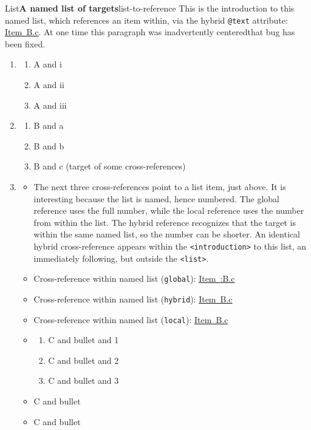 \documentclass[pdflatex]{sn-jnl}
\theoremstyle{thmstyleone}%
\theoremstyle{thmstyletwo}%
\theoremstyle{thmstylethree}%
\newcommand{\xreffont}{\relax}
\newcommand{\mono}[1]{\texttt{#1}}
\numberwithin{equation}{section}
\begin{document}
\begin{listptx}{List}{\textbf{A named list of targets}}{list-to-reference}{}%
This is the introduction to this named list, which references an item within, via the hybrid \mono{@text} attribute:  \hyperlink{target-item}{Item~B.c}.  At one time this paragraph was inadvertently centered\textemdash{}that bug has been fixed.%
%
\begin{enumerate}[label={\Alph*}]
\item{}%
\begin{enumerate}[label={\roman*}]
\item{}A and i%
\item{}A and ii%
\item{}A and iii%
\end{enumerate}
%
\item{}%
\begin{enumerate}[label={\alph*}]
\item{}B and a%
\item{}B and b%
\item\hypertarget{target-item}{}B and c (target of some cross-references)%
\end{enumerate}
%
\item{}%
\begin{itemize}[label=\textbullet]
\item{}The next three cross-references point to a list item, just above.  It is interesting because the list is named, hence numbered.  The global reference uses the full number, while the local reference uses the number from within the list.  The hybrid reference recognizes that the target is within the same named list, so the number can be shorter.  An identical hybrid cross-reference appears within the \mono{<introduction>} to this list, an immediately following, but outside the \mono{<list>}.%
\item{}Cross-reference within named list (\mono{global}): \hyperlink{target-item}{Item~{\xreffont 12.4:B.c}}%
\item{}Cross-reference within named list (\mono{hybrid}): \hyperlink{target-item}{Item~B.c}%
\item{}Cross-reference within named list (\mono{local}): \hyperlink{target-item}{Item~B.c}%
\item{}%
\begin{enumerate}[label={\arabic*}]
\item{}C and bullet and 1%
\item\hypertarget{target-no-number}{}C and bullet and 2%
\item{}C and bullet and 3%
\end{enumerate}
%
\item{}C and bullet%
\item{}C and bullet%
\end{itemize}
%
\end{enumerate}
\end{listptx}%
\end{document}
